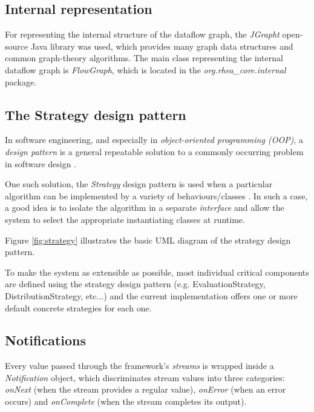 \documentclass[sigplan,review,anonymous]{acmart}\settopmatter{printfolios=true}
\begin{document}
\subsection{Internal representation}

For representing the internal structure of the dataflow graph, the \textit{JGrapht} open-source Java library was used, which provides many graph data structures and common graph-theory algorithms. The main class representing the internal dataflow graph is \textit{FlowGraph},  which is located in the \textit{org.rhea\_core.internal} package.

\subsection{The Strategy design pattern}

In software engineering, and especially in \textit{object-oriented programming (OOP)}, a \textit{design pattern} is a general repeatable solution to a commonly occurring problem in software design \cite{design}.

One such solution, the \textit{Strategy} design pattern is used when a particular algorithm can be implemented by a variety of behaviours/classes \cite{design}. In such a case, a good idea is to isolate the algorithm in a separate \textit{interface} and allow the system to select the appropriate instantiating classes at runtime.

Figure \ref{fig:strategy} illustrates the basic UML diagram of the strategy design pattern.

To make the system as extensible as possible, most individual critical components are defined using the strategy design pattern (e.g. EvaluationStrategy, DistributionStrategy, etc...) and the current implementation offers one or more default concrete strategies for each one.


\subsection{Notifications}
Every value passed through the framework's \textit{streams} is wrapped inside a \textit{Notification} object, which discriminates stream values into three categories: \textit{onNext} (when the stream provides a regular value), \textit{onError} (when an error occurs) and \textit{onComplete} (when the stream completes its output).
\end{document}

